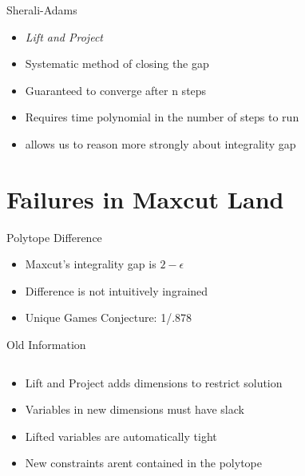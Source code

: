 \documentclass{beamer}
\begin{document}
\begin{frame}{Sherali-Adams}
\begin{itemize}
	\item {\em Lift and Project}
	\item Systematic method of closing the gap
	\item Guaranteed to converge after n steps
	\item Requires time polynomial in the number of steps to run
	\item allows us to reason more strongly about integrality gap
\end{itemize}
\end{frame}

\section{Failures in Maxcut Land}

\begin{frame}{Polytope Difference}
\begin{itemize}
	\item Maxcut's integrality gap is $2-\epsilon$
	\item Difference is not intuitively ingrained
	\item Unique Games Conjecture: 1/.878
\end{itemize}
\end{frame}

\begin{frame}{Old Information}
\begin{columns}
\begin{column}{6cm}
\begin{itemize}
	\item Lift and Project adds dimensions to restrict solution
	\item Variables in new dimensions must have slack
	\item Lifted variables are automatically tight
	\item New constraints arent contained in the polytope
\end{itemize}
\end{column}
\begin{column}{4cm}
\end{column}
\end{columns}
\end{frame}
\end{document}
